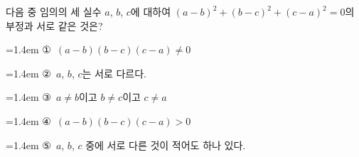다음 중 임의의 세 실수 $a$, $b$, $c$에 대하여 $(a-b)^2+(b-c)^2+(c-a)^2=0$의 부정과 서로 같은 것은?
\par\medskip\par\noindent\hangindent=1.4em {\small ①}\ $(a-b)(b-c)(c-a)\ne 0$\par\noindent\hangindent=1.4em {\small ②}\ $a$, $b$, $c$는 서로 다르다.\par\noindent\hangindent=1.4em {\small ③}\ $a\ne b$이고 $b\ne c$이고 $c\ne a$\par\noindent\hangindent=1.4em {\small ④}\ $(a-b)(b-c)(c-a)>0$\par\noindent\hangindent=1.4em {\small ⑤}\ $a$, $b$, $c$ 중에 서로 다른 것이 적어도 하나 있다.\par\medskip
